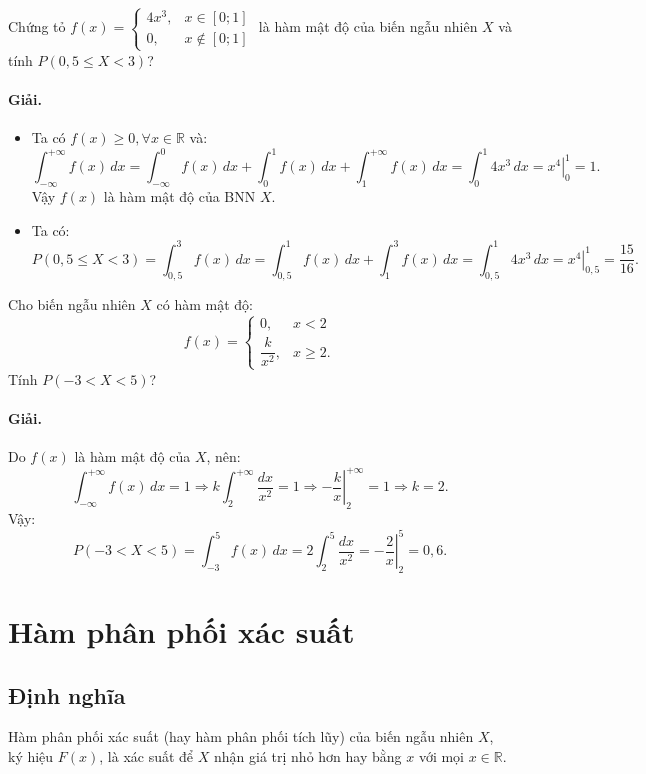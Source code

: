 \begin{vidu}[VD 5]
Chứng tỏ $f(x) = \begin{cases} 4x^3, & x \in [0; 1] \\ 0, & x \notin [0; 1] \end{cases}$ là hàm mật độ của biến ngẫu nhiên $X$ và tính $P(0{,}5 \le X < 3)$?

\paragraph{Giải.}
\begin{itemize}
    \item Ta có $f(x) \ge 0, \forall x \in \mathbb{R}$ và:
    \[
    \int_{-\infty}^{+\infty} f(x)\,dx = \int_{-\infty}^0 f(x)\,dx + \int_0^1 f(x)\,dx + \int_1^{+\infty} f(x)\,dx = \int_0^1 4x^3\,dx = \left.x^4\right|_0^1 = 1.
    \]
    Vậy $f(x)$ là hàm mật độ của BNN $X$.
    \item Ta có:
    \[
    P(0{,}5 \le X < 3) = \int_{0{,}5}^3 f(x)\,dx = \int_{0{,}5}^1 f(x)\,dx + \int_1^3 f(x)\,dx = \int_{0{,}5}^1 4x^3\,dx = \left.x^4\right|_{0{,}5}^1 = \frac{15}{16}.
    \]
\end{itemize}
\end{vidu}

\begin{vidu}[VD 6]
Cho biến ngẫu nhiên $X$ có hàm mật độ:
\[
f(x) = \begin{cases}
0, & x < 2 \\
\dfrac{k}{x^2}, & x \ge 2.
\end{cases}
\]
Tính $P(-3 < X < 5)$?

\paragraph{Giải.} Do $f(x)$ là hàm mật độ của $X$, nên:
\[
\int_{-\infty}^{+\infty} f(x)\,dx = 1 \Rightarrow k \int_2^{+\infty} \frac{dx}{x^2} = 1 \Rightarrow \left.-\frac{k}{x}\right|_2^{+\infty} = 1 \Rightarrow k = 2.
\]
Vậy:
\[
P(-3 < X < 5) = \int_{-3}^5 f(x)\,dx = 2 \int_2^5 \frac{dx}{x^2} = \left.-\frac{2}{x}\right|_2^5 = 0{,}6.
\]
\end{vidu}

\section{Hàm phân phối xác suất}

\subsection{Định nghĩa}
Hàm phân phối xác suất (hay hàm phân phối tích lũy) của biến ngẫu nhiên $X$, ký hiệu $F(x)$, là xác suất để $X$ nhận giá trị nhỏ hơn hay bằng $x$ với mọi $x \in \mathbb{R}$.

